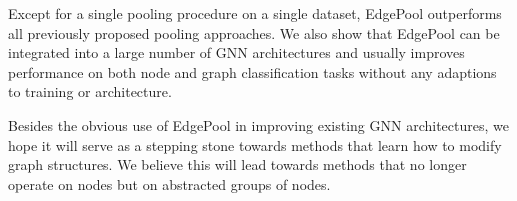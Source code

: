 \documentclass{article}
\newcommand{\edgepool}{EdgePool}
\begin{document}
Except for a single pooling procedure on a single dataset, \edgepool{} outperforms all previously proposed pooling approaches. We also show that \edgepool{} can be integrated into a large number of \gls{GNN} architectures and usually improves performance on both node and graph classification tasks without any adaptions to training or architecture.

Besides the obvious use of \edgepool{} in improving existing \gls{GNN} architectures, we hope it will serve as a stepping stone towards methods that learn how to modify graph structures. We believe this will lead towards methods that no longer operate on nodes but on abstracted groups of nodes. 
\newpage



\end{document}
